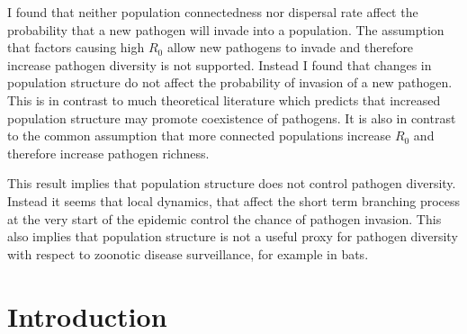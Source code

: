 I found that neither population connectedness nor dispersal rate affect the probability that a new pathogen will invade into a population.
The assumption that factors causing high $R_0$ allow new pathogens to invade and therefore increase pathogen diversity is not supported.
Instead I found that changes in population structure do not affect the probability of invasion of a new pathogen.
This is in contrast to much theoretical literature which predicts that increased population structure may promote coexistence of pathogens.
It is also in contrast to the common assumption that more connected populations increase $R_0$ and therefore increase pathogen richness.

This result implies that population structure does not control pathogen diversity.
Instead it seems that local dynamics, that affect the short term branching process at the very start of the epidemic control the chance of pathogen invasion.
This also implies that population structure is not a useful proxy for pathogen diversity with respect to zoonotic disease surveillance, for example in bats.









\section{Introduction}





